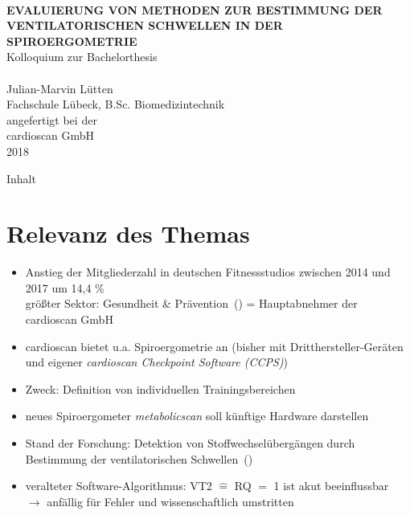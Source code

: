 \documentclass[colorBG,slideColor,8pt]{beamer}
\newcommand{\talktitle}{Evaluierung von Methoden zur Bestimmung der ventilatorischen Schwellen in der Spiroergometrie}
\begin{document}
\begin{frame}
    \vspace{-10ex}
    \textcolor{fhlred}{\HRuleFill[0.4ex]} \\ \vspace{1ex}
    {\linespread{1.5}\selectfont
    \MakeUppercase{\bf \huge \talktitle}\\[5.5ex]}
    \normalsize Kolloquium zur Bachelorthesis\\
    \textcolor{fhlred}{\HRuleFill[0.1ex]} \\ \vspace{4ex}
    \small Julian-Marvin Lütten\\
    \small Fachschule Lübeck, B.Sc. Biomedizintechnik\\
    \vspace{2ex}
    \small angefertigt bei der\\
    \small cardioscan GmbH\\
    \small 2018
\end{frame}

\begin{frame}{Inhalt}
\tableofcontents
\end{frame}


\section{Relevanz des Themas}

\begin{frame}
\begin{itemize}
	\item Anstieg der Mitgliederzahl in deutschen Fitnessstudios zwischen 2014 und 2017 um 14,4 \%\\größter Sektor: Gesundheit \& Prävention~(\cite{DSSV.2018}) = Hauptabnehmer der cardioscan GmbH
	\item cardioscan bietet u.a. Spiroergometrie an (bisher mit Dritthersteller-Geräten und eigener \textsl{cardioscan Checkpoint Software (CCPS)})
	\item Zweck: Definition von individuellen Trainingsbereichen
	\item neues Spiroergometer \textsl{metabolicscan} soll künftige Hardware darstellen
	\item Stand der Forschung: Detektion von Stoffwechselübergängen durch Bestimmung der ventilatorischen Schwellen~(\cite{Westhoff.2012})
	\item veralteter Software-Algorithmus: VT2 $\hat{=}$  RQ $=$ 1 ist akut beeinflussbar\\$\rightarrow$ anfällig für Fehler und wissenschaftlich umstritten
\end{itemize}
\end{frame}
\end{document}
